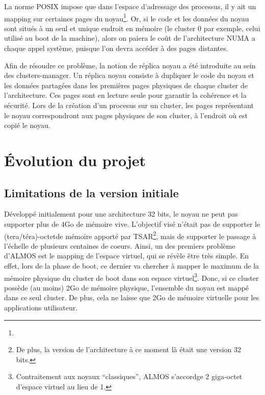       La norme POSIX impose que dans l'espace d'adressage des processus, il y
      ait un mapping sur certaines pages du noyau\footnote{}. Or, si le code et les données du noyau
      sont situés à un seul et unique endroit en mémoire (le cluster 0 par
      exemple, celui utilisé au boot de la machine), alors on paiera le coût de
      l'architecture NUMA a chaque appel système, puisque l'on devra accéder à
      des pages distantes.

      Afin de résoudre ce problème, la notion de réplica noyau a été introduite
      au sein des clusters-manager. Un réplica noyau consiste à dupliquer le
      code du noyau et les données partagées dans les premières pages physiques
      de chaque cluster de l'architecture. Ces pages sont en lecture seule pour
      garantir la cohérence et la sécurité. Lors de la création d'un procesus
      sur un cluster, les pages représentant le noyau correspondront aux pages
      physiques de son cluster, à l'endroit où est copié le noyau.


  \section{Évolution du projet}

    \subsection{Limitations de la version initiale}
    \label{subsec:unsolved}
    
      Développé initialement pour une architecture 32 bits, le noyau ne peut pas
      supporter plus de 4Go de mémoire vive. L'objectif visé n'était pas de
      supporter le (tera/téra)-octetde mémoire apporté par TSAR\footnote{De
        plus, la version de l'architecture à ce moment là était une version 32
        bits.}, mais de supporter le passage à l'échelle de plusieurs centaines
      de coeurs. Ainsi, un des premiers problème d'ALMOS est le mapping de
      l'espace virtuel, qui se révèle être très simple. En effet, lors de la
      phase de boot, ce dernier va chercher à mapper le maximum de la mémoire
      physique du cluster de boot dans son espace virtuel\footnote{Contraitement
        aux noyaux ``classiques'', ALMOS s'accordge 2 giga-octet d'espace
        virtuel au lieu de 1.}. Donc, si ce cluster possède (au moins) 2Go de
      mémoire physique, l'ensemble du noyau est mappé dans ce seul cluster. De
      plus, cela ne laisse que 2Go de mémoire virtuelle pour les applications
      utilisateur.

